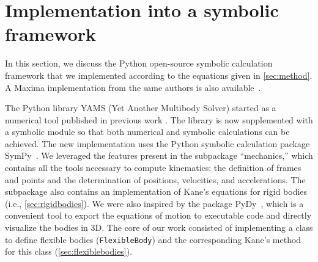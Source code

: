 \documentclass[wes, manuscript]{copernicus}
\begin{document}
\section{Implementation into a symbolic framework}
\label{sec:implementation}
In this section, we discuss the Python open-source symbolic calculation framework that we implemented according to the equations given in \autoref{sec:method}. 
A Maxima implementation from the same authors is also available~\citep{CADynTurb}.

The Python library YAMS (Yet Another Multibody Solver) started as a numerical tool published in previous work \citep{branlard:2019flex}.
The library is now supplemented with a symbolic module so that both numerical and symbolic calculations can be achieved.
The new implementation uses the Python symbolic calculation package SymPy~\citep{sympy}.
We leveraged the features present in the subpackage ``mechanics,'' which contains all the tools necessary to compute kinematics: the definition of frames and points and the determination of positions, velocities, and accelerations. The subpackage also contains an implementation of Kane's equations for rigid bodies (i.e., \autoref{sec:rigidbodies}).
We were also inspired by the package PyDy~\citep{Gede:2013}, which is a convenient tool to export the equations of motion to executable code and directly visualize the bodies in 3D.
The core of our work consisted of implementing a class to define flexible bodies (\texttt{FlexibleBody}) and the corresponding Kane's method for this class (\autoref{sec:flexiblebodies}).  
\end{document}
